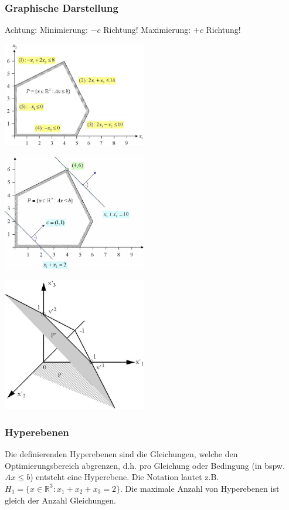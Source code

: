  	\subsubsection{Graphische Darstellung}
 	  Achtung: Minimierung: $-c$ Richtung! Maximierung: $+c$ Richtung!\\
 	  
 	\begin{minipage}{6.2cm}
 		\includegraphics[width=6.3cm]{./Content/LinProg/Hyperplanes}
 	\end{minipage}
 	\begin{minipage}{6.8cm}
 	 	\includegraphics[width=6.3cm]{./Content/LinProg/SolveGraph}
 	\end{minipage}
 	\begin{minipage}{5.9cm}
 	 	 \includegraphics[width=6.3cm]{./Content/LinProg/Koordinatensystem}
 	\end{minipage}
 	
 	  
  \subsubsection{Hyperebenen}
    Die definierenden Hyperebenen sind die Gleichungen, welche den Optimierungsbereich abgrenzen, d.h. pro Gleichung oder Bedingung (in bspw. $Ax \leq b$) entsteht eine Hyperebene. Die Notation lautet z.B. $H_1 = \{x \in \mathbb{R}^3: x_1 + x_2 + x_3 = 2\}$. Die maximale Anzahl von Hyperebenen ist gleich der Anzahl Gleichungen.
    
